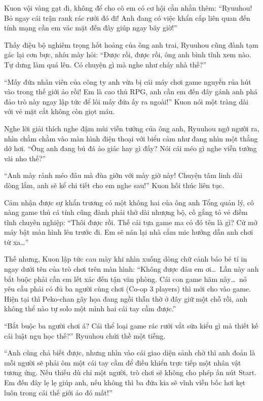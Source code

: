 \documentclass[../main.tex]{subfiles}
\begin{document}
Kuon vội vàng gạt đi, không để cho cô em có cơ hội cằn nhằn thêm: ``Ryuuhou! Bỏ ngay cái trận rank rác rưởi đó đi! Anh đang có việc khẩn cấp liên quan đến tính mạng cần em vác mặt đến đây giúp ngay bây giờ!''

Thấy điệu bộ nghiêm trọng hốt hoảng của ông anh trai, Ryuuhou cũng đành tạm gác lại cơn bực, nhíu mày hỏi: ``Được rồi, được rồi, ông anh bình tĩnh xem nào. Tự dưng làm quá lên. Có chuyện gì mà nghe như cháy nhà thế?''

``Mấy đứa nhân viên của công ty anh vừa bị cái máy chơi game nguyền rủa hút vào trong thế giới ảo rồi! Em là cao thủ RPG, anh cần em đến đây gánh anh phá đảo trò này ngay lập tức để lôi mấy đứa ấy ra ngoài!'' Kuon nói một tràng dài với vẻ mặt cắt không còn giọt máu.

Nghe lời giải thích nghe đậm mùi viễn tưởng của ông anh, Ryuuhou ngớ người ra, nhìn chằm chằm vào màn hình điện thoại với biểu cảm như đang nhìn một thằng dở hơi. ``Ông anh đang bú đá ảo giác hay gì đấy? Nói cái méo gì nghe viễn tưởng vãi nho thế?''

``Anh mày rảnh méo đâu mà đùa giỡn với mày giờ này! Chuyện tâm linh dài dòng lắm, anh sẽ kể chi tiết cho em nghe sau!'' Kuon hối thúc liên tục.

Cảm nhận được sự khẩn trương có một không hai của ông anh Tổng quản lý, cô nàng game thủ cá tính cũng đành phải thở dài nhượng bộ, cố gắng tỏ vẻ điềm tĩnh chuyên nghiệp: ``Thôi được rồi. Thế cái tựa game ma cỏ đó tên là gì? Cứ mở máy bật màn hình lên trước đi. Em sẽ nán lại nhà cắm mic hướng dẫn anh chơi từ xa\dots''

Thế nhưng, Kuon lập tức cau mày khi nhìn xuống dòng chữ cảnh báo bé tí in ngay dưới tên của trò chơi trên màn hình: ``Không được đâu em ơi\dots\ Lần này anh bắt buộc phải cần em lết xác đến tận văn phòng. Cái con game hãm này\dots\ nó yêu cầu phải có đủ ba người cùng chơi (Co-op 3 players) thì mới cho vào game. Hiện tại thì Peko-chan gây họa đang ngồi thẫn thờ ở đây giữ một chỗ rồi, anh không thể nào tự solo một mình hai cái tay cầm được.''

``Bắt buộc ba người chơi á? Cái thể loại game rác rưởi vắt sữa kiểu gì mà thiết kế cái luật ngu học thế?'' Ryuuhou chửi thề một tiếng.

``Anh cũng chả biết được, nhưng nhìn vào cái giao diện sảnh chờ thì anh đoán là mỗi người sẽ phải ôm một cái tay cầm để điều khiển trực tiếp một nhân vật tương ứng. Nếu thiếu dù chỉ một người, trò chơi sẽ không cho phép ấn nút Start. Em đến đây lẹ lẹ giúp anh, nếu không thì ba đứa kia sẽ vĩnh viễn bốc hơi kẹt luôn trong cái thế giới ảo đó mất!''
\end{document}

